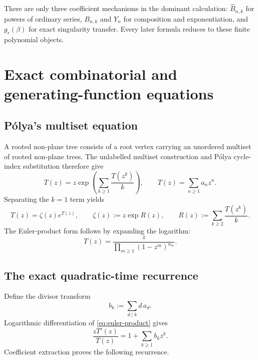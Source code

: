 \documentclass[11pt,oneside]{article}
\numberwithin{equation}{section}
\theoremstyle{plain}
\theoremstyle{definition}
\theoremstyle{remark}
\newcommand{\Bhat}{\widehat{B}}
\begin{document}
\begin{summarybox}
There are only three coefficient mechanisms in the dominant calculation:
$\Bhat_{n,k}$ for powers of ordinary series, $B_{n,k}$ and $Y_n$ for
composition and exponentiation, and $g_r(\beta)$ for exact singularity
transfer.  Every later formula reduces to these finite polynomial objects.
\end{summarybox}

\section{Exact combinatorial and generating-function equations}\label{sec:exact}

\subsection{P\'olya's multiset equation}

A rooted non-plane tree consists of a root vertex carrying an unordered
multiset of rooted non-plane trees.  The unlabelled multiset construction and
P\'olya cycle-index substitution therefore give
\cite{Polya1937,FlajoletSedgewick2009,OEISA000081}
\begin{equation}\label{eq:polya-functional}
 T(z)=z\exp\!\left(\sum_{k\ge1}\frac{T(z^k)}{k}\right),
 \qquad T(z)=\sum_{n\ge1}a_nz^n.
\end{equation}
Separating the $k=1$ term yields
\begin{equation}\label{eq:zeta-normal}
 T(z)=\zeta(z)e^{T(z)},\qquad
 \zeta(z):=z\exp R(z),\qquad
 R(z):=\sum_{k\ge2}\frac{T(z^k)}{k}.
\end{equation}
The Euler-product form follows by expanding the logarithm:
\begin{equation}\label{eq:euler-product}
 T(z)=\frac{z}{\displaystyle\prod_{m\ge1}(1-z^m)^{a_m}}.
\end{equation}

\subsection{The exact quadratic-time recurrence}

Define the divisor transform
\begin{equation}\label{eq:divisor-transform}
 b_k:=\sum_{d\mid k}d\,a_d.
\end{equation}
Logarithmic differentiation of \eqref{eq:euler-product} gives
\[
 \frac{zT'(z)}{T(z)}=1+\sum_{k\ge1}b_kz^k.
\]
Coefficient extraction proves the following recurrence.
\end{document}
